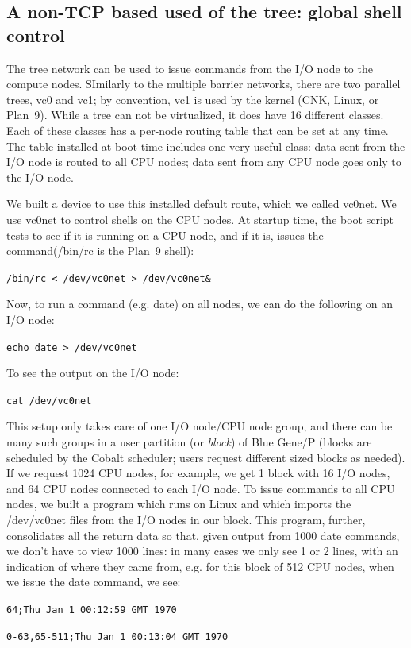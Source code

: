 \documentclass[letterpaper,twocolumn,10pt]{article}
\begin{document}
\subsection{A non-TCP based used of the tree: global shell control}
The tree network can be used to issue commands from the I/O node to the compute nodes. SImilarly to the multiple barrier networks, there are two parallel trees, vc0 and vc1; by convention, vc1 is used by the kernel (CNK, Linux, or Plan~9). While a tree can not be virtualized, it does have 16 different classes. Each of these classes has a per-node routing table that can be set at any time. The table installed at boot time includes one very useful class: data sent from the I/O node is routed to all CPU nodes; data sent from any CPU node goes only to the I/O node.  

We built a device to use this installed default route, which we called vc0net. 
We use vc0net to control shells on the CPU nodes. At startup time, the boot script tests to see if it is running on a CPU node, and if it is, issues the command(/bin/rc is the Plan~9 shell):

\texttt{/bin/rc < /dev/vc0net > /dev/vc0net\&}

Now, to run a command (e.g. date) on all nodes, we can do the following on an I/O node: 

\texttt{echo date > /dev/vc0net}

To see the output on the I/O node: 

\texttt{cat /dev/vc0net}

This setup only takes care of one I/O node/CPU node group, and there can be many such groups in a user partition (or \textit{block}) of Blue Gene/P (blocks are scheduled by the Cobalt scheduler; users request different sized blocks as needed). If we request 1024 CPU nodes, for example, we get 1 block with 16 I/O nodes, and 64 CPU nodes connected to each I/O node. To issue commands to all CPU nodes, we built a program which runs on Linux and which imports the /dev/vc0net files from the I/O nodes in our block. This program, further, consolidates all the return data so that, given output from 1000 date commands, we don't have to view 1000 lines: in many cases we only see 1 or 2 lines, with an indication of where they came from, e.g. for this block of 512 CPU nodes, when we issue the date command, we see:

\texttt{64;Thu Jan  1 00:12:59 GMT 1970}

\texttt{0-63,65-511;Thu Jan  1 00:13:04 GMT 1970}
\end{document}

